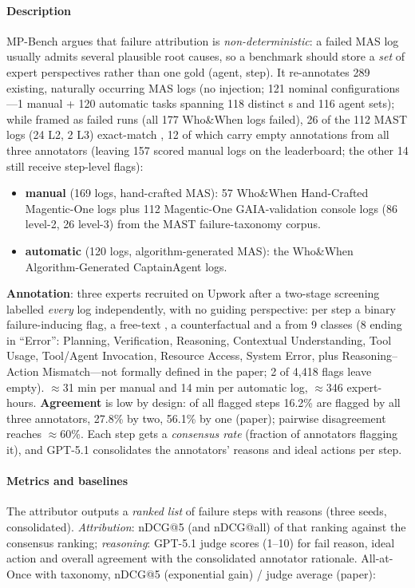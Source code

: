 \paragraph{Description} MP-Bench argues that failure attribution is \emph{non-deterministic}: a failed MAS log usually admits several plausible root causes, so a benchmark should store a \emph{set} of expert perspectives rather than one gold (agent, step). It re-annotates 289 existing, naturally occurring MAS logs (no injection; 121 nominal configurations---1 manual + 120 automatic tasks spanning 118 distinct s and 116 agent sets); while framed as failed runs (all 177 Who\&When logs failed), 26 of the 112 MAST logs (24 L2, 2 L3) exact-match , 12 of which carry empty annotations from all three annotators (leaving 157 scored manual logs on the leaderboard; the other 14 still receive step-level flags):
\begin{itemize}
\item \textbf{manual} (169 logs, hand-crafted MAS): 57 Who\&When Hand-Crafted Magentic-One logs plus 112 Magentic-One GAIA-validation console logs (86 level-2, 26 level-3) from the MAST failure-taxonomy corpus.
\item \textbf{automatic} (120 logs, algorithm-generated MAS): the Who\&When Algorithm-Generated CaptainAgent logs.
\end{itemize}
\textbf{Annotation}: three experts recruited on Upwork after a two-stage screening labelled \emph{every} log independently, with no guiding perspective: per step a binary failure-inducing flag, a free-text , a counterfactual  and a  from 9 classes (8 ending in ``Error'': Planning, Verification, Reasoning, Contextual Understanding, Tool Usage, Tool/Agent Invocation, Resource Access, System Error, plus Reasoning--Action Mismatch---not formally defined in the paper; 2 of 4,418 flags leave  empty). $\approx$31 min per manual and 14 min per automatic log, $\approx$346 expert-hours. \textbf{Agreement} is low by design: of all flagged steps 16.2\% are flagged by all three annotators, 27.8\% by two, 56.1\% by one (paper); pairwise disagreement reaches $\approx$60\%. Each step gets a \emph{consensus rate} (fraction of annotators flagging it), and GPT-5.1 consolidates the annotators' reasons and ideal actions per step.

\paragraph{Metrics and baselines} The attributor outputs a \emph{ranked list} of failure steps with reasons (three seeds, consolidated). \emph{Attribution}: nDCG@5 (and nDCG@all) of that ranking against the consensus ranking; \emph{reasoning}: GPT-5.1 judge scores (1--10) for fail reason, ideal action and overall agreement with the consolidated annotator rationale. All-at-Once with taxonomy, nDCG@5 (exponential gain) / judge average (paper):

